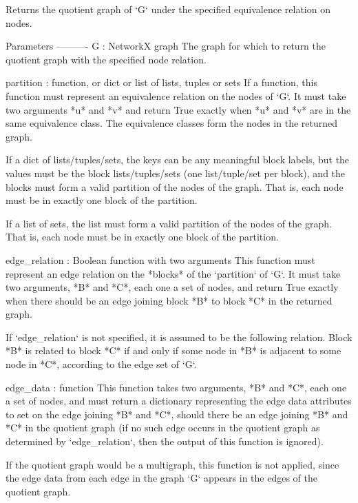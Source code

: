 \begin{DoxyVerb}Returns the quotient graph of `G` under the specified equivalence
relation on nodes.

Parameters
----------
G : NetworkX graph
    The graph for which to return the quotient graph with the
    specified node relation.

partition : function, or dict or list of lists, tuples or sets
    If a function, this function must represent an equivalence
    relation on the nodes of `G`. It must take two arguments *u*
    and *v* and return True exactly when *u* and *v* are in the
    same equivalence class. The equivalence classes form the nodes
    in the returned graph.

    If a dict of lists/tuples/sets, the keys can be any meaningful
    block labels, but the values must be the block lists/tuples/sets
    (one list/tuple/set per block), and the blocks must form a valid
    partition of the nodes of the graph. That is, each node must be
    in exactly one block of the partition.

    If a list of sets, the list must form a valid partition of
    the nodes of the graph. That is, each node must be in exactly
    one block of the partition.

edge_relation : Boolean function with two arguments
    This function must represent an edge relation on the *blocks* of
    the `partition` of `G`. It must take two arguments, *B* and *C*,
    each one a set of nodes, and return True exactly when there should be
    an edge joining block *B* to block *C* in the returned graph.

    If `edge_relation` is not specified, it is assumed to be the
    following relation. Block *B* is related to block *C* if and
    only if some node in *B* is adjacent to some node in *C*,
    according to the edge set of `G`.

edge_data : function
    This function takes two arguments, *B* and *C*, each one a set
    of nodes, and must return a dictionary representing the edge
    data attributes to set on the edge joining *B* and *C*, should
    there be an edge joining *B* and *C* in the quotient graph (if
    no such edge occurs in the quotient graph as determined by
    `edge_relation`, then the output of this function is ignored).

    If the quotient graph would be a multigraph, this function is
    not applied, since the edge data from each edge in the graph
    `G` appears in the edges of the quotient graph.


\end{DoxyVerb}

